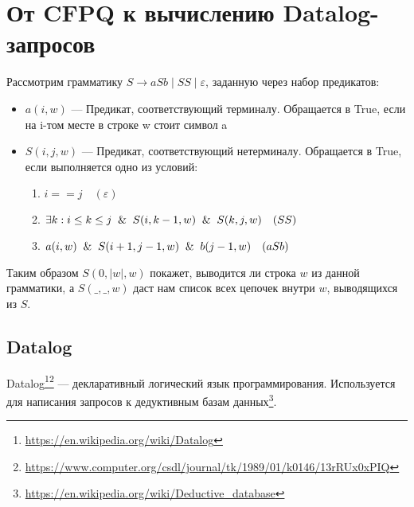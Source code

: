 \section{От CFPQ к вычислению Datalog-запросов}\label{Subsection Datalog}
Рассмотрим грамматику  $S \rightarrow aSb \mid SS \mid \varepsilon$, заданную через набор предикатов:
\begin{itemize}
	\item $a(i, w)$ --- Предикат, соответствующий терминалу. Обращается в True, если на i-том месте в строке w стоит символ a
	\item $S(i, j, w)$ --- Предикат, соответствующий нетерминалу. Обращается в True, если выполняется одно из условий:
	\begin{enumerate}
		\item $i == j \quad(\varepsilon)$
		\item $\exists k: i \leq k \leq j \And S(i, k - 1, w) \And S(k, j, w)  \quad (SS)$
		\item  ${a(i, w) \And S(i+1, j-1, w) \And b(j-1, w)} \quad (aSb)$
	\end{enumerate}
\end{itemize}

Таким образом $S(0,\mid w \mid,w)$ покажет, выводится ли строка $w$ из данной грамматики,
а $S(\_,\_,w)$ даст нам список всех цепочек внутри $w$, выводящихся из $S$.

\subsection{Datalog}
Datalog\footnote{\url{https://en.wikipedia.org/wiki/Datalog}}\footnote{\url{https://www.computer.org/csdl/journal/tk/1989/01/k0146/13rRUx0xPIQ}} --- декларативный логический язык программирования. Используется для написания запросов к дедуктивным базам данных\footnote{\url{https://en.wikipedia.org/wiki/Deductive_database}}. \\

